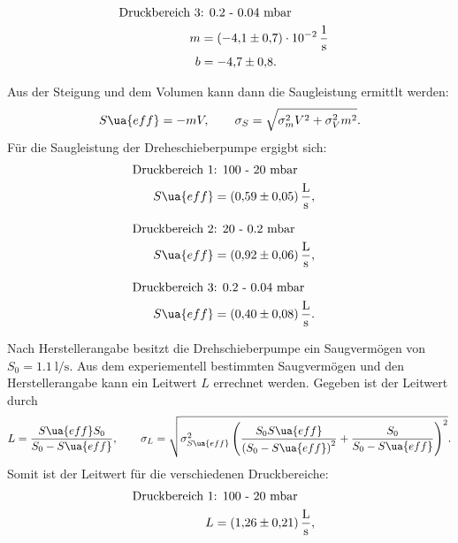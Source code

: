 \begin{align}
  \label{eq: regression_dreh_druck_3}
  \begin{aligned}
  \text{Druckbereich 3} &\text{: 0.2 - 0.04 mbar}& \\
  m&=\SI{-4.1\pm0.7 e-2}{\per\second} \\
  b&=\num{-4.7 \pm0.8 }.
\end{aligned}
\end{align}

Aus der Steigung und dem Volumen kann dann die Saugleistung ermittlt werden:
\begin{equation}
  \label{eq: saug_druck}
  S\ua{eff}=-mV, \qquad \sigma_{S}=\sqrt{\sigma_{m}^{2} V^{2} + \sigma_{V}^{2} m^{2}}.
\end{equation}
Für die Saugleistung der Dreheschieberpumpe ergigbt sich:
\begin{align}
  \label{eq:dreh_saug_1}
  \begin{aligned}
  \text{Druckbereich 1} &\text{: 100 - 20 mbar}& \\
   S\ua{eff}&=\SI{0.59\pm 0.05}{\litre\per\second},
\end{aligned}
\end{align}

\begin{align}
  \label{eq:dreh_saug_2}
  \begin{aligned}
  \text{Druckbereich 2} &\text{: 20 - 0.2 mbar}& \\
   S\ua{eff}&=\SI{0.92\pm 0.06}{\litre\per\second},
\end{aligned}
\end{align}

\begin{align}
  \label{eq:dreh_saug_3}
  \begin{aligned}
  \text{Druckbereich 3} &\text{: 0.2 - 0.04 mbar}& \\
   S\ua{eff}&=\SI{0.40\pm 0.08}{\litre\per\second}.
\end{aligned}
\end{align}

Nach Herstellerangabe besitzt die Drehschieberpumpe ein Saugvermögen von $S_0=\SI{1.1}{\litre\per\second}$.
Aus dem experiementell bestimmten Saugvermögen und den Herstellerangabe kann ein Leitwert $L$ errechnet werden.
Gegeben ist der Leitwert durch
\begin{equation}
  \label{eq: leitwert}
  L=\frac{S\ua{eff} S_0}{S_0-S\ua{eff}}, \qquad \sigma_L=\sqrt{ \sigma_{S\ua{eff}}^{2} \left(\frac{S_{0} S\ua{eff}}{\left(S_{0} - S\ua{eff}\right)^{2}} + \frac{S_{0}}{S_{0} - S\ua{eff}}\right)^{2}}.
\end{equation}
Somit ist der Leitwert für die verschiedenen Druckbereiche:
\begin{align}
  \label{eq:dreh_leit_1}
  \begin{aligned}
  \text{Druckbereich 1} &\text{: 100 - 20 mbar}& \\
   L&=\SI{1.26\pm 0.21}{\litre\per\second},
\end{aligned}
\end{align}

